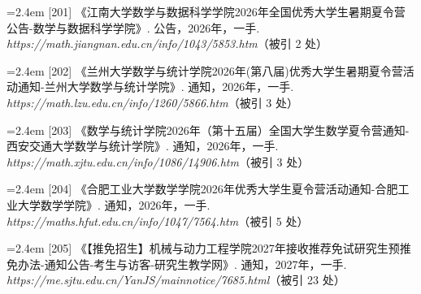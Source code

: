{\noindent\hangindent=2.4em \label{src:S0258}{\color{cAccent}[201]} 《江南大学数学与数据科学学院2026年全国优秀大学生暑期夏令营公告-数学与数据科学学院》. 公告，2026年，一手. \textit{https://math.jiangnan.edu.cn/info/1043/5853.htm}（被引 2 处）\par
\vspace{0.6pt}
\vspace{3.5pt}\par
\nopagebreak\vspace{1pt}
\noindent\hangindent=2.4em \label{src:S0259}{\color{cAccent}[202]} 《兰州大学数学与统计学院2026年(第八届)优秀大学生暑期夏令营活动通知-兰州大学数学与统计学院》. 通知，2026年，一手. \textit{https://math.lzu.edu.cn/info/1260/5866.htm}（被引 3 处）\par
\vspace{0.6pt}
\vspace{3.5pt}\par
\nopagebreak\vspace{1pt}
\noindent\hangindent=2.4em \label{src:S0260}{\color{cAccent}[203]} 《数学与统计学院2026年（第十五届）全国大学生数学夏令营通知-西安交通大学数学与统计学院》. 通知，2026年，一手. \textit{https://math.xjtu.edu.cn/info/1086/14906.htm}（被引 3 处）\par
\vspace{0.6pt}
\vspace{3.5pt}\par
\nopagebreak\vspace{1pt}
\noindent\hangindent=2.4em \label{src:S0261}{\color{cAccent}[204]} 《合肥工业大学数学学院2026年优秀大学生夏令营活动通知-合肥工业大学数学学院》. 通知，2026年，一手. \textit{https://maths.hfut.edu.cn/info/1047/7564.htm}（被引 5 处）\par
\vspace{0.6pt}
\vspace{3.5pt}\par
\nopagebreak\vspace{1pt}
\noindent\hangindent=2.4em \label{src:S0262}{\color{cAccent}[205]} 《【推免招生】机械与动力工程学院2027年接收推荐免试研究生预推免办法-通知公告-考生与访客-研究生教学网》. 通知，2027年，一手. \textit{https://me.sjtu.edu.cn/YanJS/mainnotice/7685.html}（被引 23 处）\par
\vspace{0.6pt}
}

